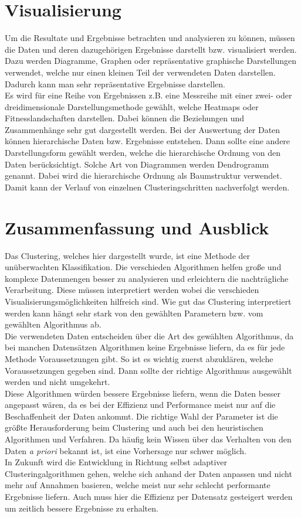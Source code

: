 \section{Visualisierung}
Um die Resultate und Ergebnisse betrachten und analysieren zu können, müssen die Daten und deren dazugehörigen Ergebnisse darstellt bzw. visualisiert werden. Dazu werden  Diagramme, Graphen oder repräsentative graphische Darstellungen verwendet, welche nur einen kleinen Teil der verwendeten Daten darstellen. Dadurch kann man sehr repräsentative Ergebnisse darstellen. \\
Es wird für eine Reihe von Ergebnissen z.B. eine Messreihe mit einer zwei- oder dreidimensionale Darstellungsmethode gewählt, welche Heatmaps oder Fitnesslandschaften darstellen. Dabei können die Beziehungen und Zusammenhänge sehr gut dargestellt werden. Bei der Auswertung der Daten können hierarchische Daten bzw. Ergebnisse entstehen. Dann sollte eine andere Darstellungsform gewählt werden, welche die hierarchische Ordnung von den Daten berücksichtigt. Solche Art von Diagrammen werden Dendrogramm genannt. Dabei wird die hierarchische Ordnung als Baumstruktur verwendet. Damit kann der Verlauf von einzelnen Clusteringschritten  nachverfolgt werden. 

\section{Zusammenfassung und Ausblick}
Das Clustering, welches hier dargestellt wurde, ist eine Methode der unüberwachten Klassifikation. Die verschieden Algorithmen helfen große und komplexe Datenmengen besser zu analysieren und erleichtern die nachträgliche Verarbeitung. Diese müssen interpretiert werden wobei die verschieden Visualisierungsmöglichkeiten hilfreich sind. Wie gut das Clustering interpretiert werden kann hängt sehr stark von den gewählten Parametern bzw. vom gewählten Algorithmus ab. \\
Die verwendeten Daten entscheiden über die Art des gewählten Algorithmus, da bei manchen Datensätzen Algorithmen keine Ergebnisse liefern, da es für jede Methode Voraussetzungen gibt. So ist es wichtig zuerst abzuklären, welche Voraussetzungen gegeben sind. Dann sollte der richtige Algorithmus ausgewählt werden und nicht umgekehrt.\\
Diese Algorithmen würden bessere Ergebnisse liefern, wenn die Daten besser angepasst wären, da es bei der Effizienz und Performance meist nur auf die Beschaffenheit der Daten ankommt. Die richtige Wahl der Parameter ist die größte Herausforderung beim Clustering und auch bei den heuristischen Algorithmen und Verfahren. Da häufig kein Wissen über das Verhalten von den Daten \textit{a priori}  bekannt ist, ist eine Vorhersage nur schwer möglich. \\
In Zukunft wird die Entwicklung in Richtung selbst adaptiver Clusteringalgorithmen gehen, welche sich anhand der Daten anpassen und nicht mehr auf Annahmen basieren, welche meist nur sehr schlecht performante Ergebnisse liefern. Auch muss hier die Effizienz per Datensatz gesteigert werden um zeitlich bessere Ergebnisse zu erhalten.